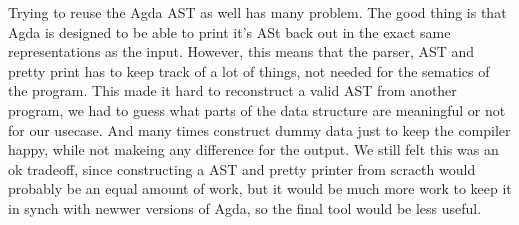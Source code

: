 \documentclass[parskip=half]{scrartcl}
\begin{document}
Trying to reuse the Agda AST as well has many problem. The good thing is that
Agda is designed to be able to print it's ASt back out in the exact same
representations as the input. However, this means that the parser, AST and
pretty print has to keep track of a lot of things, not needed for the sematics
of the program. This made it hard to reconstruct a valid AST from another
program, we had to guess what parts of the data structure are meaningful or not
for our usecase. And many times construct dummy data just to keep the compiler
happy, while not makeing any difference for the output. We still felt this was
an ok tradeoff, since constructing a AST and pretty printer from scracth would
probably be an equal amount of work, but it would be much more work to keep it
in synch with newwer versions of Agda, so the final tool would be less useful.








% 

\newpage
\printbibliography{}
\end{document}
